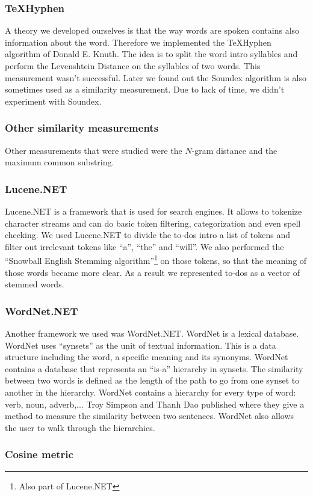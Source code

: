 \documentclass[a4paper,titlepage]{article}
\begin{document}
\subsubsection{TeXHyphen}
A theory we developed ourselves is that the way words are spoken contains also information about the word. Therefore we implemented the TeXHyphen algorithm\cite[p.376-406]{knuth1986tex} of Donald E. Knuth. The idea is to split the word intro syllables and perform the Levenshtein Distance on the syllables of two words. This measurement wasn't successful. Later we found out the Soundex algorithm is also sometimes used as a similarity measurement. Due to lack of time, we didn't experiment with Soundex.
\subsubsection{Other similarity measurements}
Other measurements that were studied were the $N$-gram distance and the maximum common substring.
\subsubsection{Lucene.NET}
Lucene.NET is a framework that is used for search engines. It allows to tokenize character streams and can do basic token filtering, categorization and even spell checking. We used Lucene.NET to divide the to-dos intro a list of tokens and filter out irrelevant tokens like ``a'', ``the'' and ``will''. We also performed the ``Snowball English Stemming algorithm''\footnote{Also part of Lucene.NET} on those tokens, so that the meaning of those words became more clear. As a result we represented to-dos as a vector of stemmed words.
\subsubsection{WordNet.NET}
Another framework we used was WordNet.NET. WordNet is a lexical database. WordNet uses ``synsets'' as the unit of textual information. This is a data structure including the word, a specific meaning and its synonyms. WordNet contains a database that represents an ``is-a'' hierarchy in synsets. The similarity between two words is defined as the length of the path to go from one synset to another in the hierarchy. WordNet contains a hierarchy for every type of word: verb, noun, adverb,... Troy Simpson and Thanh Dao published \cite{codeproject1} where they give a method to measure the similarity between two sentences. WordNet also allows the user to walk through the hierarchies.
\subsubsection{Cosine metric}
\end{document}
